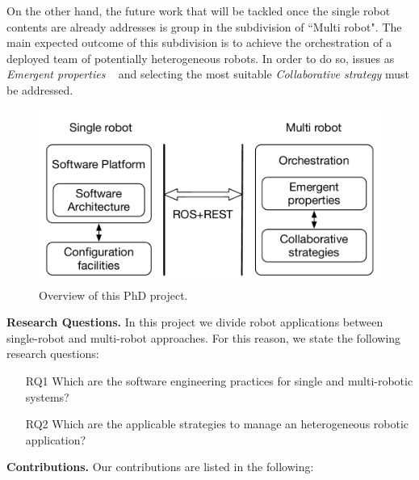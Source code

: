 On the other hand, the future work that will be tackled once the single robot contents are already addresses is group in the subdivision of ``Multi robot".
The main expected outcome of this subdivision is to achieve the orchestration of a deployed team of potentially heterogeneous robots.
In order to do so, issues as \emph{Emergent properties} ~\cite{DeAngelis2015,DeAngelis2016} and selecting the most suitable \emph{Collaborative strategy}  must be addressed.

\begin{figure}[!t]
\begin{center}
\includegraphics[width=1\linewidth]{Figures/research.pdf}
\caption{Overview of this PhD project.}
\label{fig:overview}
\end{center}
\end{figure}

\textbf{Research Questions.} 
In this project we divide robot applications between single-robot and multi-robot approaches.
For this reason, we state the following research questions:
\begin{itemize}
\item[RQ1] Which are the software engineering practices for single and multi-robotic systems? 
\item[RQ2] Which are the applicable strategies to manage an heterogeneous robotic application?
\end{itemize}

\textbf{Contributions.} 
Our contributions are listed in the following:

